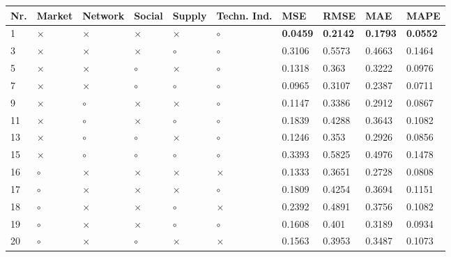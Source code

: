\begin{table}[H]
\centering
\begin{tabular}{|P{0.7cm}|P{1.3cm}P{1.3cm}P{1.3cm}P{1.3cm}P{1.3cm}|P{1.1cm}P{1.1cm}P{1.1cm}P{1.1cm}|}
\hline
 Nr. &   Market &  Network &   Social &   Supply & Techn. Ind. &             MSE &            RMSE &             MAE &            MAPE \\
 & $\times$ & $\times$ & $\times$ & $\times$ &     $\circ$ & \textbf{0.0459} & \textbf{0.2142} & \textbf{0.1793} & \textbf{0.0552} \\
   3 & $\times$ & $\times$ & $\times$ &  $\circ$ &     $\circ$ &          0.3106 &          0.5573 &          0.4663 &          0.1464 \\
   5 & $\times$ & $\times$ &  $\circ$ & $\times$ &     $\circ$ &          0.1318 &           0.363 &          0.3222 &          0.0976 \\
   7 & $\times$ & $\times$ &  $\circ$ &  $\circ$ &     $\circ$ &          0.0965 &          0.3107 &          0.2387 &          0.0711 \\
   9 & $\times$ &  $\circ$ & $\times$ & $\times$ &     $\circ$ &          0.1147 &          0.3386 &          0.2912 &          0.0867 \\
  11 & $\times$ &  $\circ$ & $\times$ &  $\circ$ &     $\circ$ &          0.1839 &          0.4288 &          0.3643 &          0.1082 \\
  13 & $\times$ &  $\circ$ &  $\circ$ & $\times$ &     $\circ$ &          0.1246 &           0.353 &          0.2926 &          0.0856 \\
  15 & $\times$ &  $\circ$ &  $\circ$ &  $\circ$ &     $\circ$ &          0.3393 &          0.5825 &          0.4976 &          0.1478 \\
  16 &  $\circ$ & $\times$ & $\times$ & $\times$ &    $\times$ &          0.1333 &          0.3651 &          0.2728 &          0.0808 \\
  17 &  $\circ$ & $\times$ & $\times$ & $\times$ &     $\circ$ &          0.1809 &          0.4254 &          0.3694 &          0.1151 \\
  18 &  $\circ$ & $\times$ & $\times$ &  $\circ$ &    $\times$ &          0.2392 &          0.4891 &          0.3756 &          0.1082 \\
  19 &  $\circ$ & $\times$ & $\times$ &  $\circ$ &     $\circ$ &          0.1608 &           0.401 &          0.3189 &          0.0934 \\
  20 &  $\circ$ & $\times$ &  $\circ$ & $\times$ &    $\times$ &          0.1563 &          0.3953 &          0.3487 &          0.1073 \\

\end{tabular}
\end{table}
